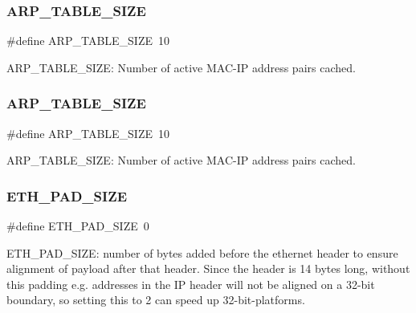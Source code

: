 \subsubsection{\texorpdfstring{A\+R\+P\+\_\+\+T\+A\+B\+L\+E\+\_\+\+S\+I\+ZE}{ARP\_TABLE\_SIZE}\hspace{0.1cm}{\footnotesize\ttfamily [1/2]}}
{\footnotesize\ttfamily \#define A\+R\+P\+\_\+\+T\+A\+B\+L\+E\+\_\+\+S\+I\+ZE~10}

A\+R\+P\+\_\+\+T\+A\+B\+L\+E\+\_\+\+S\+I\+ZE\+: Number of active M\+A\+C-\/\+IP address pairs cached. \mbox{\label{group__lwip__opts__arp_ga924936a814564dbdb0bc950d255a83b9}} 
\subsubsection{\texorpdfstring{A\+R\+P\+\_\+\+T\+A\+B\+L\+E\+\_\+\+S\+I\+ZE}{ARP\_TABLE\_SIZE}\hspace{0.1cm}{\footnotesize\ttfamily [2/2]}}
{\footnotesize\ttfamily \#define A\+R\+P\+\_\+\+T\+A\+B\+L\+E\+\_\+\+S\+I\+ZE~10}

A\+R\+P\+\_\+\+T\+A\+B\+L\+E\+\_\+\+S\+I\+ZE\+: Number of active M\+A\+C-\/\+IP address pairs cached. \mbox{\label{group__lwip__opts__arp_gad7fa3b356ca7e603e848b069c4cc6276}} 
\subsubsection{\texorpdfstring{E\+T\+H\+\_\+\+P\+A\+D\+\_\+\+S\+I\+ZE}{ETH\_PAD\_SIZE}\hspace{0.1cm}{\footnotesize\ttfamily [1/2]}}
{\footnotesize\ttfamily \#define E\+T\+H\+\_\+\+P\+A\+D\+\_\+\+S\+I\+ZE~0}

E\+T\+H\+\_\+\+P\+A\+D\+\_\+\+S\+I\+ZE\+: number of bytes added before the ethernet header to ensure alignment of payload after that header. Since the header is 14 bytes long, without this padding e.\+g. addresses in the IP header will not be aligned on a 32-\/bit boundary, so setting this to 2 can speed up 32-\/bit-\/platforms. \mbox{\label{group__lwip__opts__arp_gad7fa3b356ca7e603e848b069c4cc6276}} 
